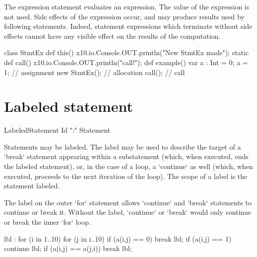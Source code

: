 The expression statement evaluates an expression. The value of the expression
is not used. Side effects of the expression occur, and may produce results
used by following statements. Indeed, statement expressions which terminate
without side effects cannot have any visible effect on the results of the
computation. 


\begin{ex}
\begin{xten}
class StmtEx {
  def this() { 
     x10.io.Console.OUT.println("New StmtEx made");  }
  static def call() { 
     x10.io.Console.OUT.println("call!");}
  def example() {
     var a : Int = 0;
     a = 1; // assignment
     new StmtEx(); // allocation
     call(); // call
  }
}
\end{xten}
%
\end{ex}



\section{Labeled statement}


\begin{bbgrammar}
    LabeledStatement \: Id \xcd":" Statement 
\end{bbgrammar}


Statements may be labeled. The label may be used to describe the target of a
\xcd`break` statement appearing within a substatement (which, when executed,
ends the labeled statement), or, in the case of a loop, a \xcd`continue` as
well (which, when executed, proceeds to the next iteration of the loop). The
scope of a label is the statement labeled.

\begin{ex}
The label on the outer \xcd`for` statement allows \xcd`continue` and
\xcd`break` statements to continue or break it.  Without the label,
\xcd`continue` or \xcd`break` would only continue or break the inner \xcd`for`
loop. 
\begin{xten}
lbl : for (i in 1..10) {
   for (j in i..10) {  
      if (a(i,j) == 0) break lbl;
      if (a(i,j) == 1) continue lbl;
      if (a(i,j) == a(j,i)) break lbl;
   }
}
\end{xten}
\end{ex}

